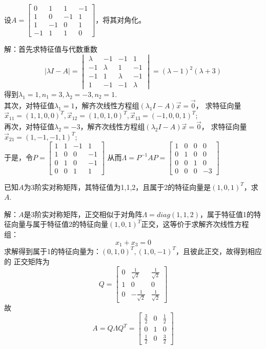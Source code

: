 \begin{eg}
设$A=\begin{bmatrix}0&1&1&-1\\1&0&-1&1\\1&-1&0&1\\-1&1&1&0\end{bmatrix}$，将其对角化。
\end{eg}
解：首先求特征值与代数重数
\begin{equation*}
|\lambda I-A|=\begin{vmatrix}\lambda&-1&-1&1\\-1&\lambda&1&-1\\
-1&1&\lambda&-1\\1&-1&-1&\lambda\end{vmatrix}=(\lambda-1)^2(\lambda+3)
\end{equation*}
得到$\lambda_1=1,n_1=3,\lambda_2=-3,n_2=1$.\\
其次，对特征值$\lambda_1=1$，解齐次线性方程组$(\lambda_1 I-A)\vec{x}=\vec{0}$，
求特征向量$\vec{x}_{11}=(1,1,0,0)^T,\vec{x}_{12}=(1,0,1,0)^T,\vec{x}_{13}=(-1,0,0,1)^T$;\\
再次，对特征值$\lambda_2=-3$，解齐次线性方程组$(\lambda_2 I-A)\vec{x}=\vec{0}$，
求特征向量$\vec{x}_{21}=(1,-1,-1,1)^T$;\\
于是，令$P=\begin{bmatrix}1&1&-1&1\\1&0&0&-1\\0&1&0&-1\\0&0&1&1\end{bmatrix}$
从而$\Lambda=P^{-1}AP=
\begin{bmatrix}1&0&0&0\\0&1&0&0\\0&0&1&0\\0&0&0&-3\end{bmatrix}$

\begin{eg}
已知$A$为3阶实对称矩阵，其特征值为1,1,2，且属于2的特征向量是$(1,0,1)^T$，求$A$.
\end{eg}
解：$A$是3阶实对称矩阵，正交相似于对角阵$\Lambda=diag(1,1,2)$，属于特征值1的特征向量与属于特征值2的特征向量$(1,0,1)^T$正交，这等价于求解齐次线性方程组：
$$x_1+x_3=0$$
求解得到属于1的特征向量为：$(0,1,0)^T,(1,0,-1)^T$，且彼此正交，故得到相应的
正交矩阵为
$$Q=\begin{bmatrix}0&\frac{1}{\sqrt{2}}&\frac{1}{\sqrt{2}}\\1&0&0\\
0&-\frac{1}{\sqrt{2}}&\frac{1}{\sqrt{2}}\end{bmatrix}$$
故
$$A=Q\Lambda Q^T=\begin{bmatrix}\frac{3}{2}&0&\frac{1}{2}\\0&1&0\\
\frac{1}{2}&0&\frac{3}{2}\end{bmatrix}$$

